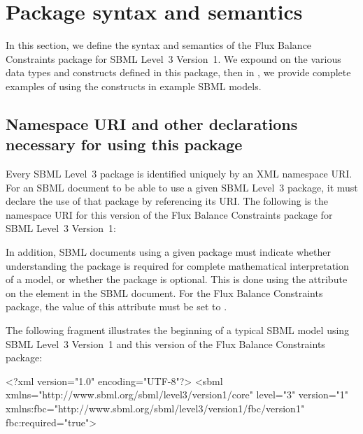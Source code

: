
\section{Package syntax and semantics}
\label{syntax}

In this section, we define the syntax and semantics of the Flux Balance
Constraints package for SBML Level~3 Version~1.  We expound on the various
data types and constructs defined in this package, then in ,
we provide complete examples of using the constructs in example SBML
models.

\subsection{Namespace URI and other declarations necessary for using this package}
\label{xml-namespace}

Every SBML Level~3 package is identified uniquely by an XML namespace URI.
For an SBML document to be able to use a given SBML Level~3 package, it
must declare the use of that package by referencing its URI.  The following
is the namespace URI for this version of the Flux Balance Constraints
package for SBML Level~3 Version~1:
\begin{center}
\end{center}

In addition, SBML documents using a given package must indicate whether
understanding the package is required for complete mathematical
interpretation of a model, or whether the package is optional.  This is
done using the attribute  on the  element in
the SBML document.  For the Flux Balance Constraints package, the value of
this attribute must be set to .

The following fragment illustrates the beginning of a typical SBML model
using SBML Level~3 Version~1 and this version of the Flux Balance
Constraints package:

\begin{example}
<?xml version="1.0" encoding="UTF-8"?>
<sbml xmlns="http://www.sbml.org/sbml/level3/version1/core" level="3" version="1"
      xmlns:fbc="http://www.sbml.org/sbml/level3/version1/fbc/version1" fbc:required="true">
\end{example}
    
